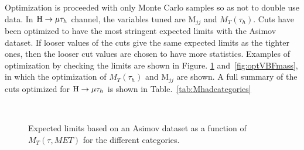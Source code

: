 Optimization is proceeded with only Monte Carlo samples so as not to double use data. In $\mathrm{H}\to \mu\tau_{h}$  channel, the variables tuned are $\textrm{M}_{jj}$ and $M_{T}(\tau_{h})$. Cuts have been optimized to have the most stringent expected limits with the Asimov dataset. If looser values of the cuts give the same expected limits as the tighter ones, then the looser cut values are chosen to have more statistics. Examples of optimization by checking the limits are shown in Figure. \ref{fig:optMT} and~\ref{fig:optVBFmass}, in which the optimization of $M_T(\tau_{h})$  and $\textrm{M}_{jj}$ are shown. A full summary of the cuts optimized for $\mathrm{H}\to \mu\tau_{h}$ is shown in Table.~\ref{tab:Mhadcategories}


\begin{figure}[htbp] 
     \centering
     \\
     \caption{Expected limits based on an Asimov dataset as a function of $M_T(\tau, MET)$ for the different categories.}
     \label{fig:optMT}
\end{figure}

